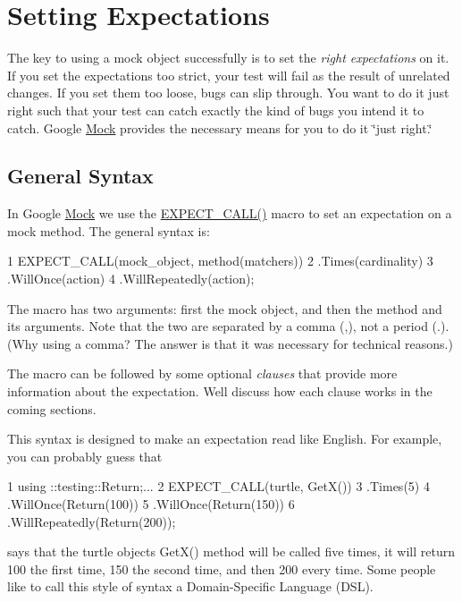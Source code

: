 \section*{Setting Expectations}

The key to using a mock object successfully is to set the {\itshape right expectations} on it. If you set the expectations too strict, your test will fail as the result of unrelated changes. If you set them too loose, bugs can slip through. You want to do it just right such that your test can catch exactly the kind of bugs you intend it to catch. Google \hyperlink{class_mock}{Mock} provides the necessary means for you to do it \char`\"{}just right.\char`\"{}

\subsection*{General Syntax}

In Google \hyperlink{class_mock}{Mock} we use the {\ttfamily \hyperlink{gmock-spec-builders_8h_a535a6156de72c1a2e25a127e38ee5232}{E\+X\+P\+E\+C\+T\+\_\+\+C\+A\+L\+L()}} macro to set an expectation on a mock method. The general syntax is\+:


\begin{DoxyCode}
1 EXPECT\_CALL(mock\_object, method(matchers))
2     .Times(cardinality)
3     .WillOnce(action)
4     .WillRepeatedly(action);
\end{DoxyCode}


The macro has two arguments\+: first the mock object, and then the method and its arguments. Note that the two are separated by a comma ({\ttfamily ,}), not a period ({\ttfamily .}). (Why using a comma? The answer is that it was necessary for technical reasons.)

The macro can be followed by some optional {\itshape clauses} that provide more information about the expectation. We\textquotesingle{}ll discuss how each clause works in the coming sections.

This syntax is designed to make an expectation read like English. For example, you can probably guess that


\begin{DoxyCode}
1 using ::testing::Return;...
2 EXPECT\_CALL(turtle, GetX())
3     .Times(5)
4     .WillOnce(Return(100))
5     .WillOnce(Return(150))
6     .WillRepeatedly(Return(200));
\end{DoxyCode}


says that the {\ttfamily turtle} object\textquotesingle{}s {\ttfamily Get\+X()} method will be called five times, it will return 100 the first time, 150 the second time, and then 200 every time. Some people like to call this style of syntax a Domain-\/\+Specific Language (D\+SL).

